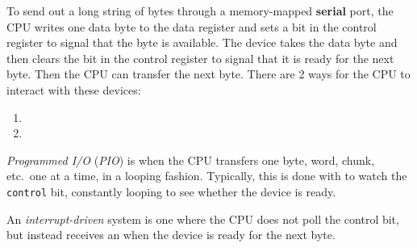 To send out a long string of bytes through a memory-mapped \textbf{serial} port, the CPU writes one data byte to the data register and sets a bit in the control register to signal that the byte is available.
The device takes the data byte and then clears the bit in the control register to signal that it is ready for the next byte.
Then the CPU can transfer the next byte.
There are 2 ways for the CPU to interact with these devices:
\begin{enumerate}[noitemsep]
\item {}
\item {}
\end{enumerate}

\begin{definition}[Programmed I/O]\label{def:Programmed_IO}
  \emph{Programmed I/O} (\emph{PIO}) is when the CPU transfers one byte, word, chunk, etc.\ one at a time, in a looping fashion.
  Typically, this is done with  to watch the \texttt{control} bit, constantly looping to see whether the device is ready.
\end{definition}

\begin{definition}\label{def:Interrupt_Driven}
  An \emph{interrupt-driven} system is one where the CPU does not poll the control bit, but instead receives an  when the device is ready for the next byte.
\end{definition}


